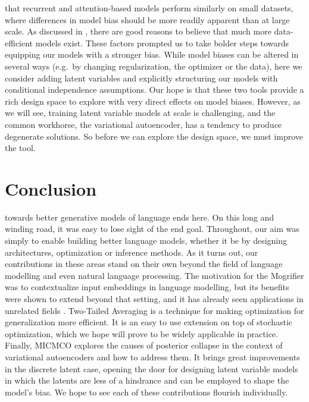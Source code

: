 \documentclass[12pt,a4paper,oneside]{book}
\begin{document}
that recurrent and attention-based models perform similarly on small datasets, where differences in model bias should be more readily apparent than at large scale.
As discussed in , there are good reasons to believe that much more data-efficient models exist.
These factors prompted us to take bolder steps towards equipping our models with a stronger bias.
While model biases can be altered in several ways (e.g.\ by changing regularization, the optimizer or the data), here we consider adding latent variables and explicitly structuring our models with conditional independence assumptions.
Our hope is that these two tools provide a rich design space to explore with very direct effects on model biases.
However, as we will see, training latent variable models at scale is challenging, and the common workhorse, the variational autoencoder, has a tendency to produce degenerate solutions.
So before we can explore the design space, we must improve the tool.




\chapter{Conclusion}

towards better generative models of language ends here.
On this long and winding road, it was easy to lose sight of the end goal.
Throughout, our aim was simply to enable building better language models, whether it be by designing architectures, optimization or inference methods.
As it turns out, our contributions in these areas stand on their own beyond the field of language modelling and even natural language processing.
The motivation for the Mogrifier was to contextualize input embeddings in language modelling, but its benefits were shown to extend beyond that setting, and it has already seen applications in unrelated fields \citep{zhang2022modality,cui2022end}.
Two-Tailed Averaging is a technique for making optimization for generalization more efficient.
It is an easy to use extension on top of stochastic optimization, which we hope will prove to be widely applicable in practice.
Finally, MICMCO explores the causes of posterior collapse in the context of variational autoencoders and how to address them.
It brings great improvements in the discrete latent case, opening the door for designing latent variable models in which the latents are less of a hindrance and can be employed to shape the model's bias.
We hope to see each of these contributions flourish individually.
\end{document}

